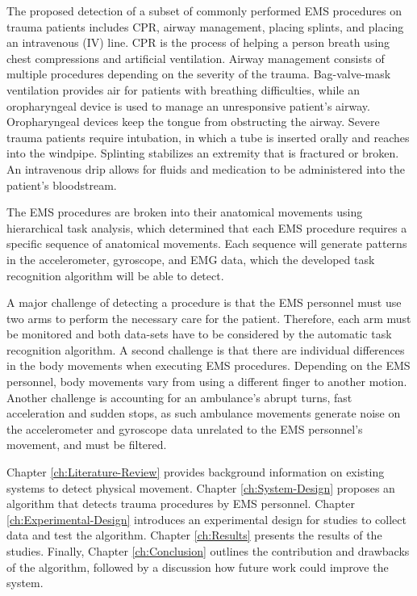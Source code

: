 \par The proposed detection of a subset of commonly performed EMS procedures on trauma patients includes \gls{CPR}, airway management, placing splints, and placing an intravenous (\gls{IV}) line. CPR is the process of helping a person breath using chest compressions and artificial ventilation. Airway management consists of multiple procedures depending on the severity of the trauma. Bag-valve-mask ventilation provides air for patients with breathing difficulties, while an oropharyngeal device is used to manage an unresponsive patient's airway. Oropharyngeal devices keep the tongue from obstructing the airway. Severe trauma patients require intubation, in which a tube is inserted orally and reaches into the windpipe. Splinting stabilizes an extremity that is fractured or broken. An intravenous drip allows for fluids and medication to be administered into the patient’s bloodstream.
\par The EMS procedures are broken into their anatomical movements using hierarchical task analysis, which determined that each EMS procedure requires a specific sequence of anatomical movements. Each sequence will generate patterns in the accelerometer, gyroscope, and EMG data, which the developed task recognition algorithm will be able to detect.
\par A major challenge of detecting a procedure is that the EMS personnel must use two arms to perform the necessary care for the patient. Therefore, each arm must be monitored and both data-sets have to be considered by the automatic task recognition algorithm. A second challenge is that there are individual differences in the body movements when executing EMS procedures. Depending on the EMS personnel, body movements vary from using a different finger to another motion. Another challenge is accounting for an ambulance's abrupt turns, fast acceleration and sudden stops, as such ambulance movements generate noise on the accelerometer and gyroscope data unrelated to the EMS personnel's movement, and must be filtered.
\par Chapter \ref{ch:Literature-Review} provides background information on existing systems to detect physical movement. Chapter \ref{ch:System-Design} proposes an algorithm that detects trauma procedures by \gls{EMS} personnel. Chapter \ref{ch:Experimental-Design} introduces an experimental design for studies to collect data and test the algorithm. Chapter \ref{ch:Results} presents the results of the studies. Finally, Chapter \ref{ch:Conclusion} outlines the contribution and drawbacks of the algorithm, followed by a discussion how future work could improve the system. 
